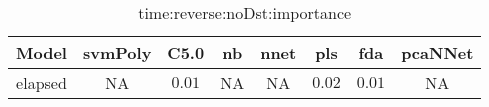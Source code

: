 \begin{table}[!ht]
	\centering
	\begin{tabular}{|c|c|c|c|c|c|c|c|}
		\hline
		Model & svmPoly & C5.0 & nb & nnet & pls & fda & pcaNNet \\ \hline
		elapsed & NA & $0.01$ & NA & NA & $0.02$ & $0.01$ & NA \\ \hline
	\end{tabular}
	\caption{time:reverse:noDst:importance}
	\label{tab:time:reverse:noDst:importance}
\end{table}
